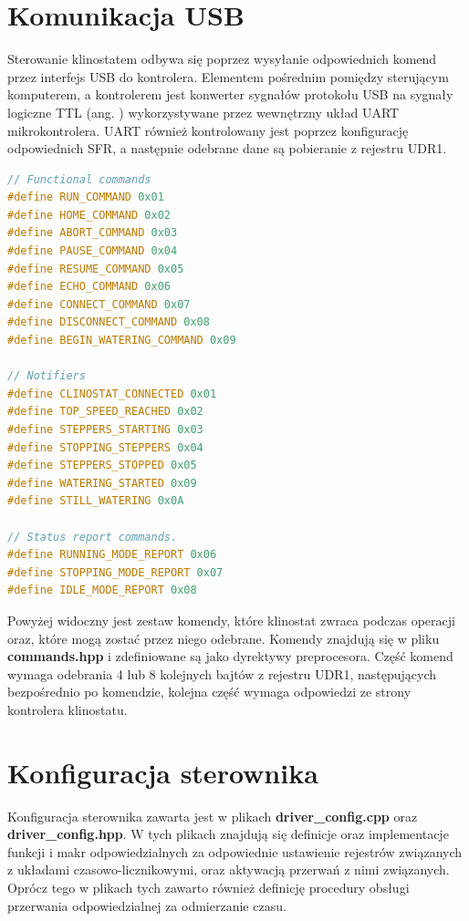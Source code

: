\section{Komunikacja USB}

Sterowanie klinostatem odbywa się poprzez wysyłanie odpowiednich komend przez interfejs USB do kontrolera. Elementem pośrednim pomiędzy sterującym komputerem, a kontrolerem jest konwerter sygnałów protokołu USB na sygnały logiczne TTL (ang. ) wykorzystywane przez wewnętrzny układ UART mikrokontrolera. UART również kontrolowany jest poprzez konfigurację odpowiednich SFR, a następnie odebrane dane są pobieranie z rejestru UDR1.
\begin{lstlisting}[language=C++, caption=commands.hpp]
// Functional commands	
#define RUN_COMMAND 0x01
#define HOME_COMMAND 0x02
#define ABORT_COMMAND 0x03
#define PAUSE_COMMAND 0x04
#define RESUME_COMMAND 0x05
#define ECHO_COMMAND 0x06
#define CONNECT_COMMAND 0x07
#define DISCONNECT_COMMAND 0x08
#define BEGIN_WATERING_COMMAND 0x09

// Notifiers
#define CLINOSTAT_CONNECTED 0x01
#define TOP_SPEED_REACHED 0x02
#define STEPPERS_STARTING 0x03
#define STOPPING_STEPPERS 0x04
#define STEPPERS_STOPPED 0x05
#define WATERING_STARTED 0x09
#define STILL_WATERING 0x0A

// Status report commands.
#define RUNNING_MODE_REPORT 0x06
#define STOPPING_MODE_REPORT 0x07
#define IDLE_MODE_REPORT 0x08
\end{lstlisting}
Powyżej widoczny jest zestaw komendy, które klinostat zwraca podczas operacji oraz, które mogą zostać przez niego odebrane. Komendy znajdują się w pliku \textbf{commands.hpp} i zdefiniowane są jako dyrektywy preprocesora. Część komend wymaga odebrania 4 lub 8 kolejnych bajtów z rejestru UDR1, następujących bezpośrednio po komendzie, kolejna część wymaga odpowiedzi ze strony kontrolera klinostatu.

\section{Konfiguracja sterownika}

Konfiguracja sterownika zawarta jest w plikach \textbf{driver\_config.cpp} oraz \textbf{driver\_config.hpp}. W tych plikach znajdują się definicje oraz implementacje funkcji i makr odpowiedzialnych za odpowiednie ustawienie rejestrów związanych z układami czasowo-licznikowymi, oraz aktywacją przerwań z nimi związanych. Oprócz tego w plikach tych zawarto również definicję procedury obsługi przerwania odpowiedzialnej za odmierzanie czasu.


